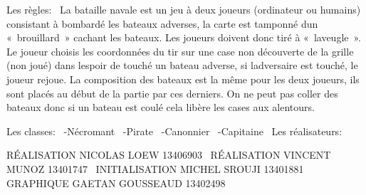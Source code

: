 Les règles\+:~\newline
La bataille navale est un jeu à deux joueurs (ordinateur ou humains) consistant à bombardé les bateaux adverses, la carte est tamponné d\textquotesingle{}un « brouillard » cachant les bateaux. Les joueurs doivent donc tiré à « l\textquotesingle{}aveugle ». Le joueur choisis les coordonnées du tir sur une case non découverte de la grille (non joué) dans l\textquotesingle{}espoir de touché un bateau adverse, si l\textquotesingle{}adversaire est touché, le joueur rejoue. La composition des bateaux est la même pour les deux joueurs, ils sont placés au début de la partie par ces derniers. On ne peut pas coller des bateaux donc si un bateau est coulé cela libère les cases aux alentours.

Les classes\+:~\newline
-\/\+Nécromant~\newline
-\/\+Pirate~\newline
-\/\+Canonnier~\newline
-\/\+Capitaine~\newline
 Les réalisateurs\+:

RÉ\+A\+L\+I\+S\+A\+T\+I\+ON N\+I\+C\+O\+L\+AS L\+O\+EW 13406903~\newline
RÉ\+A\+L\+I\+S\+A\+T\+I\+ON V\+I\+N\+C\+E\+NT M\+U\+N\+OZ 13401747~\newline
I\+N\+I\+T\+I\+A\+L\+I\+S\+A\+T\+I\+ON M\+I\+C\+H\+EL S\+R\+O\+U\+JI 13401881~\newline
G\+R\+A\+P\+H\+I\+Q\+UE G\+A\+E\+T\+AN G\+O\+U\+S\+S\+E\+A\+UD 13402498~\newline
